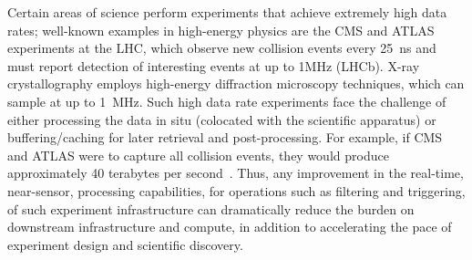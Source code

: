 Certain areas of science perform experiments that achieve extremely high data rates; well-known examples in high-energy physics are the CMS and ATLAS experiments at the LHC, which observe new collision events every 25~ns and must report detection of interesting events at up to 1MHz\cite{pmlr-v42-glig14} (LHCb).
X-ray crystallography employs high-energy diffraction microscopy techniques, which can sample at up to 1~MHz\cite{doi:10.1063/5.0006531}.
Such high data rate experiments face the challenge of either processing the data in situ (colocated with the scientific apparatus) or buffering/caching for later retrieval and post-processing.
For example, if CMS and ATLAS were to capture all collision events, they would produce approximately 40 terabytes per second~\cite{BORK2021100619}.
Thus, any improvement in the real-time, near-sensor, processing capabilities, for operations such as filtering and triggering, of such experiment infrastructure can dramatically reduce the burden on downstream infrastructure and compute, in addition to accelerating the pace of experiment design and scientific discovery.



